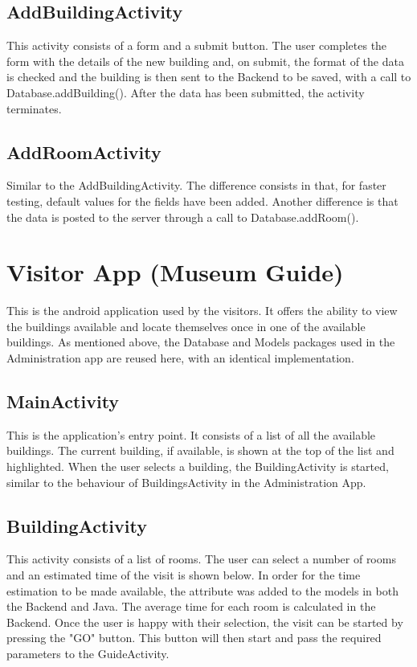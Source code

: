 \subsection{AddBuildingActivity}
This activity consists of a form and a submit button. The user completes the form with the details of the new building and, on submit, the format of the data is checked and the building is then sent to the Backend to be saved, with a call to Database.addBuilding(). After the data has been submitted, the activity terminates. 

\subsection{AddRoomActivity}
Similar to the AddBuildingActivity. The difference consists in that, for faster testing, default values for the fields have been added. Another difference is that the data is posted to the server through a call to Database.addRoom(). 

\section{Visitor App (Museum Guide)}
This is the android application used by the visitors. It offers the ability to view the buildings available and locate themselves once in one of the available buildings. As mentioned above, the Database and Models packages used in the Administration app are reused here, with an identical implementation.

\subsection{MainActivity}
This is the application's entry point. It consists of a list of all the available buildings. The current building, if available, is shown at the top of the list and highlighted.  
When the user selects a building, the BuildingActivity is started, similar to the behaviour of BuildingsActivity in the Administration App.
\subsection{BuildingActivity}
This activity consists of a list of rooms. The user can select a number of rooms and an estimated time of the visit is shown below. In order for the time estimation to be made available, the attribute was added to the models in both the Backend and Java. The average time for each room is calculated in the Backend. Once the user is happy with their selection, the visit can be started by pressing the "GO" button. This button will then start and pass the required parameters to the GuideActivity.
